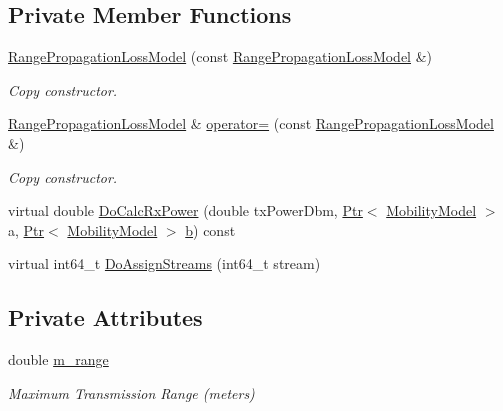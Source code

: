 \subsection*{Private Member Functions}
\begin{DoxyCompactItemize}
\item 
\hyperlink{classns3_1_1RangePropagationLossModel_a994599a15dfce611a472d488b30103bb}{Range\+Propagation\+Loss\+Model} (const \hyperlink{classns3_1_1RangePropagationLossModel}{Range\+Propagation\+Loss\+Model} \&)
\begin{DoxyCompactList}\small\item\em Copy constructor. \end{DoxyCompactList}\item 
\hyperlink{classns3_1_1RangePropagationLossModel}{Range\+Propagation\+Loss\+Model} \& \hyperlink{classns3_1_1RangePropagationLossModel_a8feb45070a0d3ab7af145a9a5afcc7bb}{operator=} (const \hyperlink{classns3_1_1RangePropagationLossModel}{Range\+Propagation\+Loss\+Model} \&)
\begin{DoxyCompactList}\small\item\em Copy constructor. \end{DoxyCompactList}\item 
virtual double \hyperlink{classns3_1_1RangePropagationLossModel_a6a377b216c413b69574ff2186fda7995}{Do\+Calc\+Rx\+Power} (double tx\+Power\+Dbm, \hyperlink{classns3_1_1Ptr}{Ptr}$<$ \hyperlink{classns3_1_1MobilityModel}{Mobility\+Model} $>$ a, \hyperlink{classns3_1_1Ptr}{Ptr}$<$ \hyperlink{classns3_1_1MobilityModel}{Mobility\+Model} $>$ \hyperlink{lte__pathloss_8m_a21ad0bd836b90d08f4cf640b4c298e7c}{b}) const 
\item 
virtual int64\+\_\+t \hyperlink{classns3_1_1RangePropagationLossModel_a10a4847075992205f9a52489b914e833}{Do\+Assign\+Streams} (int64\+\_\+t stream)
\end{DoxyCompactItemize}
\subsection*{Private Attributes}
\begin{DoxyCompactItemize}
\item 
double \hyperlink{classns3_1_1RangePropagationLossModel_af70e7bd402e7cc75b591af004242e193}{m\+\_\+range}
\begin{DoxyCompactList}\small\item\em Maximum Transmission Range (meters) \end{DoxyCompactList}\end{DoxyCompactItemize}
